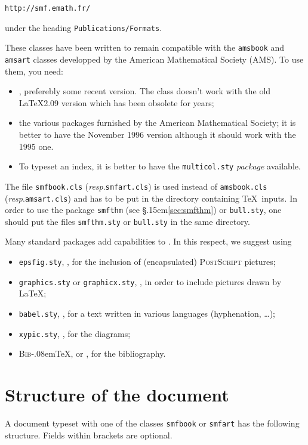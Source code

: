 \documentclass[11pt,english]{smfart}
\newcommand{\BibTeX}{{\scshape Bib}\kern-.08em\TeX}
\newcommand{\T}{\S\kern .15em\relax }
\newcommand{\resp}{\emph{resp}.\xspace}
\begin{document}
\texttt{http://smf.emath.fr/}

\noindent under the heading \verb|Publications/Formats|.

\smallskip
These classes have been written to remain compatible
with the \texttt{amsbook} and \texttt{amsart} classes developped
by the American Mathematical Society (AMS). To use them, you need:
\begin{itemize}
\item \LaTeXe, preferebly some recent version. The class
doesn't work with the old \LaTeX 2.09 version which has been obsolete for years;
\item the various packages furnished by the American Mathematical
Society; it is better to have the November 1996 version
although it should work with the 1995 one.
\item
To typeset an index, it is better to have the
\texttt{multicol.sty} {\em package} available.
\end{itemize}
The file \texttt{smfbook.cls} (\resp \texttt{smfart.cls}) is used instead of  \texttt{amsbook.cls} (\resp \texttt{amsart.cls}) and has to be put in the directory containing \TeX\ inputs. In order to use the package \texttt{smfthm} (see \T\ref{sec:smfthm}) or \texttt{bull.sty}, one should put the files \texttt{smfthm.sty} or \texttt{bull.sty} in the same directory.

Many standard packages add capabilities to \LaTeXe. In this respect, we suggest using
\begin{itemize}
\item \texttt{epsfig.sty}, \cite{epsfig}, for the inclusion of (encapsulated) {\scshape PostScript} pictures;
\item \texttt{graphics.sty} or \texttt{graphicx.sty}, \cite{graphics,graphicx}, in order to include pictures drawn by \LaTeX;
\item \texttt{babel.sty}, \cite{babel}, for a text written in various languages (hyphenation, \ldots);
\item \texttt{xypic.sty}, 
\cite{xypic}, for the diagrams;
\item {\BibTeX}, \cite[Appendix B]{lamport94} or \cite{hypatia},
for the bibliography.
\end{itemize}

\section{Structure of the document}\label{sec:struct}

A document typeset with one of the classes 
\texttt{smfbook} or \texttt{smfart} has the following structure.
Fields within brackets are optional.
\end{document}
